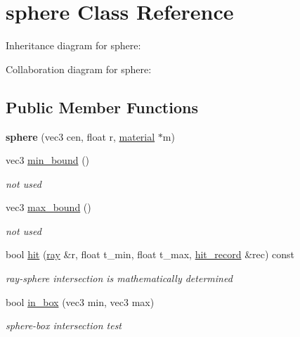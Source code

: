 \hypertarget{classsphere}{}\section{sphere Class Reference}
\label{classsphere}


Inheritance diagram for sphere\+:


Collaboration diagram for sphere\+:
\subsection*{Public Member Functions}
\begin{DoxyCompactItemize}
\item 
\mbox{\label{classsphere_a4a9dc98ff4d9ea93d7fa0bc1a8e872fb}} 
{\bfseries sphere} (vec3 cen, float r, \hyperlink{classmaterial}{material} $\ast$m)
\item 
\mbox{\label{classsphere_a51d4c96bcacbbb4bd11083ce2d6e101e}} 
vec3 \hyperlink{classsphere_a51d4c96bcacbbb4bd11083ce2d6e101e}{min\+\_\+bound} ()
\begin{DoxyCompactList}\small\item\em not used \end{DoxyCompactList}\item 
\mbox{\label{classsphere_adb18340a7be789ee0e8ab2a6342684fe}} 
vec3 \hyperlink{classsphere_adb18340a7be789ee0e8ab2a6342684fe}{max\+\_\+bound} ()
\begin{DoxyCompactList}\small\item\em not used \end{DoxyCompactList}\item 
bool \hyperlink{classsphere_a35269706d92c22a6560d038ad2cb0192}{hit} (\hyperlink{classray}{ray} \&r, float t\+\_\+min, float t\+\_\+max, \hyperlink{structhit__record}{hit\+\_\+record} \&rec) const
\begin{DoxyCompactList}\small\item\em ray-\/sphere intersection is mathematically determined \end{DoxyCompactList}\item 
bool \hyperlink{classsphere_a92ec275047fef95f50265a418b55ac66}{in\+\_\+box} (vec3 min, vec3 max)
\begin{DoxyCompactList}\small\item\em sphere-\/box intersection test \end{DoxyCompactList}\end{DoxyCompactItemize}
